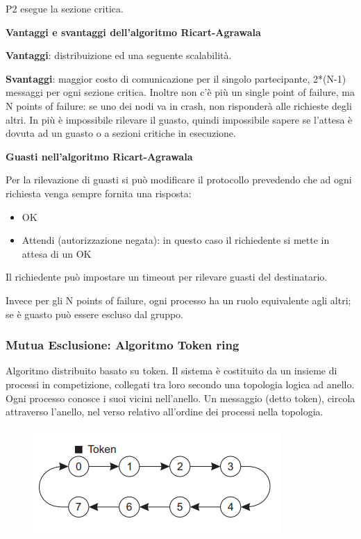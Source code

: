 \documentclass{article}
\begin{document}
P2 esegue la sezione critica.

\vspace{5mm}
\textbf{Vantaggi e svantaggi dell'algoritmo Ricart-Agrawala}

\textbf{Vantaggi}: distribuizione ed una seguente scalabilità.

\textbf{Svantaggi}: maggior costo di comunicazione per il singolo partecipante, 2*(N-1) messaggi per ogni sezione critica. Inoltre non c'è più un single point of failure, ma
N points of failure: se uno dei nodi va in crash, non risponderà alle richieste degli altri. In più è impossibile rilevare il guasto, quindi impossibile sapere se l'attesa è
dovuta ad un guasto o a sezioni critiche in esecuzione.

\vspace{3mm}
\textbf{Guasti nell'algoritmo Ricart-Agrawala}

Per la rilevazione di guasti si può modificare il protocollo prevedendo che ad ogni richiesta venga sempre fornita una risposta:
\begin{itemize}
    \item OK
    \item Attendi (autorizzazione negata): in questo caso il richiedente si mette in attesa di un OK
\end{itemize}

Il richiedente può impostare un timeout per rilevare guasti del destinatario.

Invece per gli N points of failure, ogni processo ha un ruolo equivalente agli altri; se è guasto può essere escluso dal gruppo.

\subsubsection{Mutua Esclusione: Algoritmo Token ring}

Algoritmo distribuito basato su token. Il sistema è costituito da un insieme di processi in competizione, collegati tra loro secondo una topologia logica ad anello.
Ogni processo conosce i suoi vicini nell'anello. Un messaggio (detto token), circola attraverso l'anello, nel verso relativo all'ordine dei processi nella topologia.

\begin{figure}[htbp]
    \centering
    \includegraphics[width=0.30\columnwidth]{imgs/ring.PNG}
\end{figure}
\end{document}
